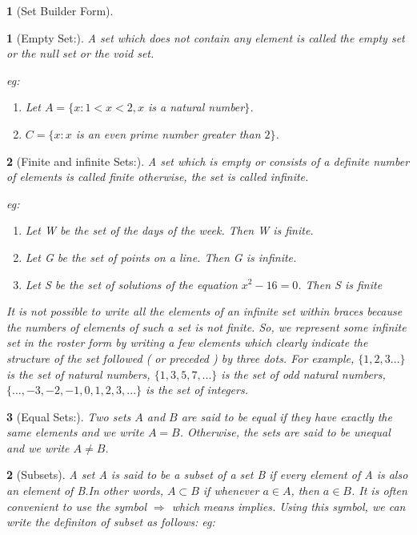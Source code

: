 \documentclass[12pt]{article}
\theoremstyle{colored}
\newtheorem*{defn}{}
\theoremstyle{subcolored}
\newtheorem*{subdefn}{}
\begin{document}
\begin{multicols}{2}
\begin{defn}[\large Set Builder Form]
    
\end{defn}

\begin{subdefn}[Empty Set:]
    A set which does not contain any element is called the empty set or the
null set or the void set.

eg:\begin{enumerate}
    \item[a)] Let $A = \{x : 1 < x < 2, x$ is a natural number$\}$. 
    \item[b)] $C = \{x : x$ is an even prime number greater than $2\}$.
\end{enumerate}

\end{subdefn}

\begin{subdefn}[Finite and infinite Sets:]
    A set which is empty or consists of a definite number of elements is
called finite otherwise, the set is called infinite.

eg:
\begin{enumerate}
    \item[a)] Let W be the set of the days of the week. Then W is finite.
    \item[b)] Let G be the set of points on a line. Then G is infinite.
    \item[c)] Let S be the set of solutions of the equation $x^2 -16 = 0$. Then S is finite 
\end{enumerate}

It is not possible to write all the elements of an infinite set within
braces { } because the numbers of elements of such a set is not finite. So, we represent some infinite set in the roster form by writing a few elements which clearly indicate the
structure of the set followed ( or preceded ) by three dots.
For example, $\{1, 2, 3 . . .\}$ is the set of natural numbers, $\{1, 3, 5, 7, . . .\}$ is the set
of odd natural numbers, $\{. . .,-3, -2, -1, 0,1, 2 ,3, . . .\}$ is the set of integers.
\end{subdefn}

\begin{subdefn}[Equal Sets:]
    Two sets $A$ and $B$ are said to be equal if they have exactly the same
elements and we write $A = B$. Otherwise, the sets are said to be unequal and we write
$A \neq B$.
    
\end{subdefn}

\begin{defn}[\large Subsets]
    \hfill \break
    A set A is said to be a subset of a set B if every element of A is also an
element of B.In other words, $A \subset B$ if whenever $a \in A$, then $a \in B$. It is often convenient to
use the symbol $\Rightarrow$ which means implies. Using this symbol, we can write the definiton
of subset as follows:
eg:


\end{defn}
\end{multicols}
\end{document}
